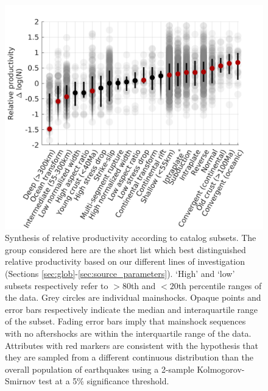 \documentclass[draft, jgrga]{agujournal2018}
\begin{document}
 \begin{figure}
        \centering
        \includegraphics{figures/cal_tech.png}
        \caption{Synthesis of relative productivity according to catalog subsets. The group considered here are the short list which best distinguished relative productivity based on our different lines of investigation (Sections \ref{sec:glob}-\ref{sec:source_parameters}). `High' and `low' subsets respectively refer to $>80$th and $<20$th percentile ranges of the data. Grey circles are individual mainshocks. Opaque points and error bars respectively indicate the median and interaquartile range of the subset. Fading error bars imply that mainshock sequences with no aftershocks are within the interquartile range of the data. Attributes with red markers are consistent with the hypothesis that they are sampled from a different continuous distribution than the overall population of earthquakes using a 2-sample Kolmogorov-Smirnov test at a 5\% significance threshold.}
        \label{fig:caltech}
    \end{figure}   
    
\end{document}
